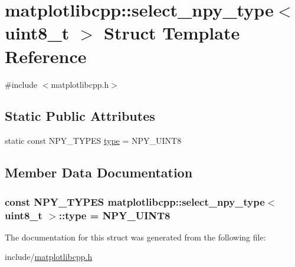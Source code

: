 \hypertarget{structmatplotlibcpp_1_1select__npy__type_3_01uint8__t_01_4}{}\section{matplotlibcpp\+:\+:select\+\_\+npy\+\_\+type$<$ uint8\+\_\+t $>$ Struct Template Reference}
\label{structmatplotlibcpp_1_1select__npy__type_3_01uint8__t_01_4}


{\ttfamily \#include $<$matplotlibcpp.\+h$>$}

\subsection*{Static Public Attributes}
\begin{DoxyCompactItemize}
\item 
static const N\+P\+Y\+\_\+\+T\+Y\+P\+ES \hyperlink{structmatplotlibcpp_1_1select__npy__type_3_01uint8__t_01_4_a6e80bfd252a69f14ff869c8b4fbb9e54}{type} = N\+P\+Y\+\_\+\+U\+I\+N\+T8
\end{DoxyCompactItemize}


\subsection{Member Data Documentation}
\subsubsection[{\texorpdfstring{type}{type}}]{\setlength{\rightskip}{0pt plus 5cm}const N\+P\+Y\+\_\+\+T\+Y\+P\+ES {\bf matplotlibcpp\+::select\+\_\+npy\+\_\+type}$<$ uint8\+\_\+t $>$\+::type = N\+P\+Y\+\_\+\+U\+I\+N\+T8\hspace{0.3cm}{\ttfamily [static]}}\hypertarget{structmatplotlibcpp_1_1select__npy__type_3_01uint8__t_01_4_a6e80bfd252a69f14ff869c8b4fbb9e54}{}\label{structmatplotlibcpp_1_1select__npy__type_3_01uint8__t_01_4_a6e80bfd252a69f14ff869c8b4fbb9e54}


The documentation for this struct was generated from the following file\+:\begin{DoxyCompactItemize}
\item 
include/\hyperlink{matplotlibcpp_8h}{matplotlibcpp.\+h}\end{DoxyCompactItemize}
